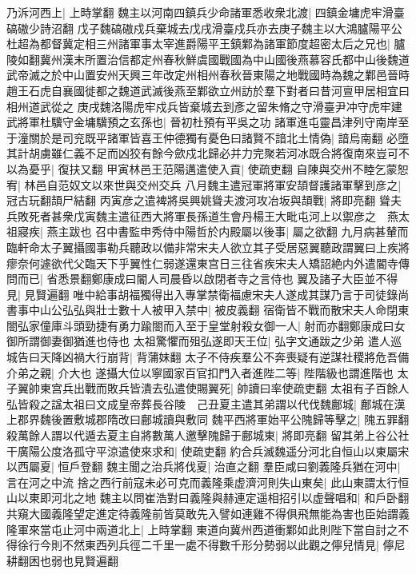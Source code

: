 乃泝河西上|{
	上時掌翻}
魏主以河南四鎮兵少命諸軍悉收衆北渡|{
	四鎮金墉虎牢滑臺碻磝少詩沼翻}
戊子魏碻磝戍兵棄城去戊戌滑臺戍兵亦去庚子魏主以大鴻臚陽平公杜超為都督冀定相三州諸軍事太宰進爵陽平王鎮鄴為諸軍節度超密太后之兄也|{
	臚陵如翻冀州漢末所置治信都定州春秋鮮虞國戰國為中山國後燕慕容氏都中山後魏道武帝滅之於中山置安州天興三年改定州相州春秋晉東陽之地戰國時為魏之鄴邑晉時趙王石虎自襄國徙都之魏道武滅後燕至鄴欲立州訪於羣下對者曰昔河亶甲居相宜曰相州道武從之}
庚戌魏洛陽虎牢戍兵皆棄城去到彥之留朱脩之守滑臺尹冲守虎牢建武將軍杜驥守金墉驥預之玄孫也|{
	晉初杜預有平吳之功}
諸軍進屯靈昌津列守南岸至于潼關於是司兖既平諸軍皆喜王仲德獨有憂色曰諸賢不諳北土情偽|{
	諳烏南翻}
必墮其計胡虜雖仁義不足而凶狡有餘今歛戍北歸必并力完聚若河冰既合將復南來豈可不以為憂乎|{
	復扶又翻}
甲寅林邑王范陽邁遣使入貢|{
	使疏吏翻}
自陳與交州不睦乞蒙恕宥|{
	林邑自范奴文以來世與交州交兵}
八月魏主遣冠軍將軍安頡督護諸軍擊到彦之|{
	冠古玩翻頡尸結翻}
丙寅彦之遣裨將吳興姚聳夫渡河攻冶坂與頡戰|{
	將即亮翻}
聳夫兵敗死者甚衆戊寅魏主遣征西大將軍長孫道生會丹楊王大毗屯河上以禦彦之　燕太祖寢疾|{
	燕主跋也}
召中書監申秀侍中陽哲於内殿屬以後事|{
	屬之欲翻}
九月病甚輦而臨軒命太子翼攝國事勒兵聽政以備非常宋夫人欲立其子受居惡翼聽政謂翼曰上疾將瘳奈何遽欲代父臨天下乎翼性仁弱遂還東宫日三往省疾宋夫人矯詔絶内外遣閽寺傳問而已|{
	省悉景翻鄭康成曰閽人司晨昏以啟閉者寺之言侍也}
翼及諸子大臣並不得見|{
	見賢遍翻}
唯中給事胡福獨得出入專掌禁衛福慮宋夫人遂成其謀乃言于司徒錄尚書事中山公弘弘與壯士數十人被甲入禁中|{
	被皮義翻}
宿衛皆不戰而散宋夫人命閉東閤弘家僮庫斗頭勁捷有勇力踰閤而入至于皇堂射殺女御一人|{
	射而亦翻鄭康成曰女御所謂御妻御猶進也侍也}
太祖驚懼而殂弘遂即天王位|{
	弘字文通跋之少弟}
遣人巡城告曰天降凶禍大行崩背|{
	背蒲妹翻}
太子不侍疾羣公不奔喪疑有逆謀社稷將危吾備介弟之親|{
	介大也}
遂攝大位以寧國家百官扣門入者進陛二等|{
	陛階級也謂進階也}
太子翼帥東宫兵出戰而敗兵皆潰去弘遣使賜翼死|{
	帥讀曰率使疏吏翻}
太祖有子百餘人弘皆殺之諡太祖曰文成皇帝葬長谷陵　己丑夏主遣其弟謂以代伐魏鄜城|{
	鄜城在漢上郡界魏後置敷城郡隋改曰鄜城讀與敷同}
魏平西將軍始平公隗歸等擊之|{
	隗五罪翻}
殺萬餘人謂以代遁去夏主自將數萬人邀擊隗歸于鄜城東|{
	將即亮翻}
留其弟上谷公社干廣陽公度洛孤守平涼遣使來求和|{
	使疏吏翻}
約合兵滅魏遥分河北自恒山以東屬宋以西屬夏|{
	恒戶登翻}
魏主聞之治兵將伐夏|{
	治直之翻}
羣臣咸曰劉義隆兵猶在河中|{
	言在河之中流}
捨之西行前寇未必可克而義隆乘虚濟河則失山東矣|{
	此山東謂太行恒山以東即河北之地}
魏主以問崔浩對曰義隆與赫連定遥相招引以虚聲唱和|{
	和戶卧翻}
共窺大國義隆望定進定待義隆前皆莫敢先入譬如連雞不得俱飛無能為害也臣始謂義隆軍來當屯止河中兩道北上|{
	上時掌翻}
東道向冀州西道衝鄴如此則陛下當自討之不得徐行今則不然東西列兵徑二千里一處不得數千形分勢弱以此觀之儜兒情見|{
	儜尼耕翻困也弱也見賢遍翻}
